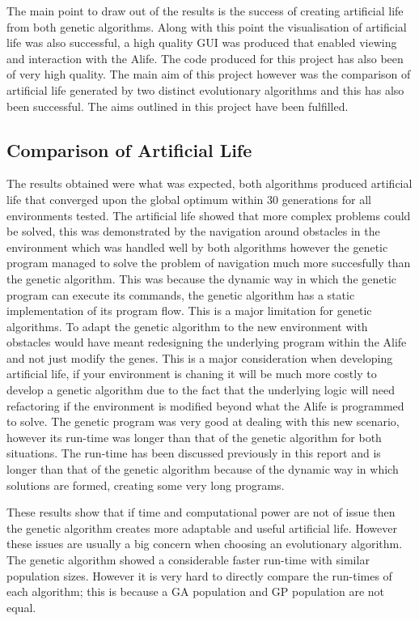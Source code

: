 \documentclass[12pt]{article}
\begin{document}
The main point to draw out of the results is the success of creating artificial life from both genetic algorithms. Along with this point the 
visualisation of artificial life was also successful, a high quality GUI was produced that enabled viewing and interaction with the Alife.
The code produced for this project has also been of very high quality. The main aim of this project however was the comparison of artificial 
life generated by two distinct evolutionary algorithms and this has also been successful. The aims outlined in this project have been fulfilled.

\subsection{Comparison of Artificial Life}
The results obtained were what was expected, both algorithms produced artificial life that converged upon the global optimum within 30 generations
for all environments tested. The artificial life showed that more complex problems could be solved, this was demonstrated by the navigation around
obstacles in the environment which was handled well by both algorithms however the genetic program managed to solve the problem of navigation much
more succesfully than the genetic algorithm. This was because the dynamic way in which the genetic program can execute its commands, the genetic
algorithm has a static implementation of its program flow. This is a major limitation for genetic algorithms. To adapt the genetic algorithm to the
new environment with obstacles would have meant redesigning the underlying program within the Alife and not just modify the genes. This is a major 
consideration when developing artificial life, if your environment is chaning it will be much more costly to develop a genetic algorithm due to the 
fact that the underlying logic will need refactoring if the environment is modified beyond what the Alife is programmed to solve. The genetic 
program was very good at dealing with this new scenario, however its run-time was longer than that of the genetic algorithm for both situations. The 
run-time has been discussed previously in this report and is longer than that of the genetic algorithm because of the dynamic way in which solutions
are formed, creating some very long programs. 

These results show that if time and computational power are not of issue then the genetic algorithm creates more adaptable and useful
artificial life. However these issues are usually a big concern when choosing an evolutionary algorithm. The genetic algorithm
showed a considerable faster run-time with similar population sizes. However it is very hard to directly compare the run-times of each algorithm;
this is because a GA population and GP population are not equal. 
\end{document}
